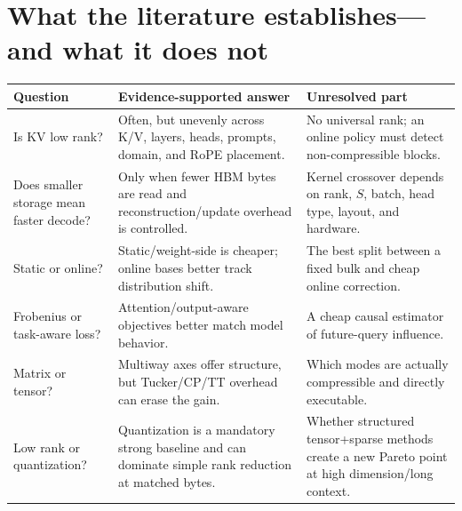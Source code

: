 \documentclass[10pt]{article}
\begin{document}
\section{What the literature establishes---and what it does not}

\begin{center}
\small
\renewcommand{\arraystretch}{1.18}
\begin{tabularx}{.98\textwidth}{@{}p{3.1cm}X X@{}}
\toprule
\textbf{Question} & \textbf{Evidence-supported answer} & \textbf{Unresolved part} \\
\midrule
Is KV low rank? & Often, but unevenly across K/V, layers, heads, prompts, domain, and RoPE
placement. & No universal rank; an online policy must detect non-compressible blocks. \\
Does smaller storage mean faster decode? & Only when fewer HBM bytes are read and
reconstruction/update overhead is controlled. & Kernel crossover depends on rank, $S$, batch,
head type, layout, and hardware. \\
Static or online? & Static/weight-side is cheaper; online bases better track distribution shift. &
The best split between a fixed bulk and cheap online correction. \\
Frobenius or task-aware loss? & Attention/output-aware objectives better match model behavior. &
A cheap causal estimator of future-query influence. \\
Matrix or tensor? & Multiway axes offer structure, but Tucker/CP/TT overhead can erase the gain. &
Which modes are actually compressible and directly executable. \\
Low rank or quantization? & Quantization is a mandatory strong baseline and can dominate simple
rank reduction at matched bytes. & Whether structured tensor+sparse methods create a new Pareto
point at high dimension/long context. \\
\bottomrule
\end{tabularx}
\end{center}
\end{document}
